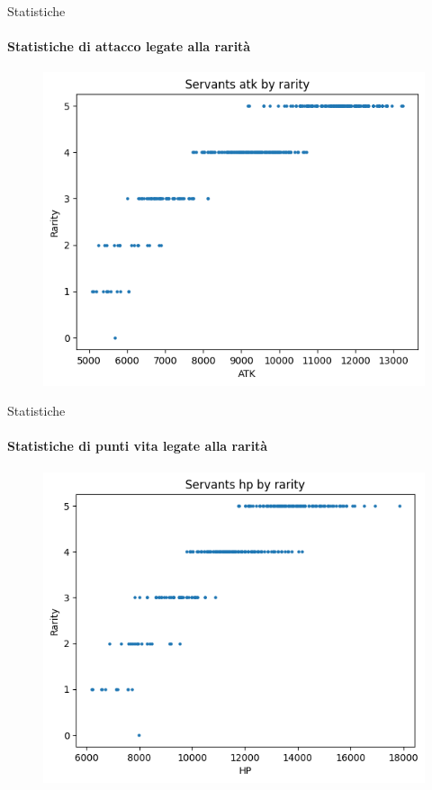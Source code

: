 \documentclass{beamer}
\begin{document}
\begin{darkframes}
  \begin{frame}{Statistiche}
    \framesubtitle{Statistiche di attacco legate alla rarità}
    \begin{figure}
      \centering
      \includegraphics[scale=0.6]{./images/class_and_stats_atk.png}
    \end{figure}
  \end{frame}

  \begin{frame}{Statistiche}
    \framesubtitle{Statistiche di punti vita legate alla rarità}
    \begin{figure}
      \centering
      \includegraphics[scale=0.6]{./images/class_and_stats_hp.png}
    \end{figure}
  \end{frame}


\end{darkframes}
\end{document}

